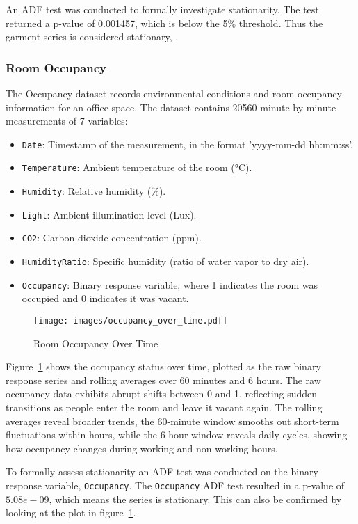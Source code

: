 \documentclass[conference]{IEEEtran}
\begin{document}
An ADF test was conducted to formally investigate stationarity. The test returned a p-value of 0.001457, which is below the 5\% threshold. Thus the garment series is considered stationary, \cite{garment_productivty}.

\subsubsection{\textbf{Room Occupancy}}

The Occupancy dataset records environmental conditions and room occupancy information for an office space. The dataset contains 20560 minute-by-minute measurements of 7 variables:

\begin{itemize}
    \item \texttt{Date}: Timestamp of the measurement, in the format 'yyyy-mm-dd hh:mm:ss'.
    \item \texttt{Temperature}: Ambient temperature of the room (\si{\celsius}).
    \item \texttt{Humidity}: Relative humidity (\%).
    \item \texttt{Light}: Ambient illumination level (Lux).
    \item \texttt{CO2}: Carbon dioxide concentration (ppm).
    \item \texttt{HumidityRatio}: Specific humidity (ratio of water vapor to dry air).
    \item \texttt{Occupancy}: Binary response variable, where 1 indicates the room was occupied and 0 indicates it was vacant.
\end{itemize}

\begin{figure}[H]
\centering
\texttt{[image: images/occupancy\_over\_time.pdf]}
\caption{Room Occupancy Over Time}
\label{fig:occupancy_over_time}
\end{figure}

Figure~\ref{fig:occupancy_over_time} shows the occupancy status over time, plotted as the raw binary response series and rolling averages over 60 minutes and 6 hours. The raw occupancy data exhibits abrupt shifts between 0 and 1, reflecting sudden transitions as people enter the room and leave it vacant again. The rolling averages reveal broader trends, the 60-minute window smooths out short-term fluctuations within hours, while the 6-hour window reveals daily cycles, showing how occupancy changes during working and non-working hours.

To formally assess stationarity an ADF test was conducted on the binary response variable, \texttt{Occupancy}. The \texttt{Occupancy} ADF test resulted in a p-value of $5.08e-09$, which means the series is stationary. This can also be confirmed by looking at the plot in figure~\ref{fig:occupancy_over_time}.
\end{document}
